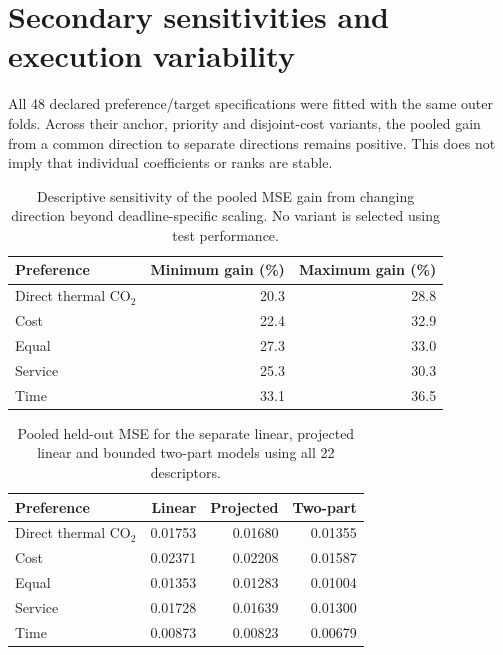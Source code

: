 \section{Secondary sensitivities and execution variability}

\label{app:robustness_results}

All 48 declared preference/target specifications were fitted with the same outer folds. Across their anchor, priority and disjoint-cost variants, the pooled gain from a common direction to separate directions remains positive. This does not imply that individual coefficients or ranks are stable.

\begin{table}[htbp]\centering\small\begin{tabular}{lrr}\toprule Preference & Minimum gain (\%) & Maximum gain (\%)\\\midrule

Direct thermal CO$_2$ & 20.3 & 28.8\\

Cost & 22.4 & 32.9\\

Equal & 27.3 & 33.0\\

Service & 25.3 & 30.3\\

Time & 33.1 & 36.5\\

\bottomrule\end{tabular}\caption{Descriptive sensitivity of the pooled MSE gain from changing direction beyond deadline-specific scaling. No variant is selected using test performance.}\end{table}

\begin{table}[htbp]\centering\small\begin{tabular}{lrrr}\toprule Preference & Linear & Projected & Two-part\\\midrule

Direct thermal CO$_2$ & 0.01753 & 0.01680 & 0.01355\\

Cost & 0.02371 & 0.02208 & 0.01587\\

Equal & 0.01353 & 0.01283 & 0.01004\\

Service & 0.01728 & 0.01639 & 0.01300\\

Time & 0.00873 & 0.00823 & 0.00679\\

\bottomrule\end{tabular}\caption{Pooled held-out MSE for the separate linear, projected linear and bounded two-part models using all 22 descriptors.}\end{table}

